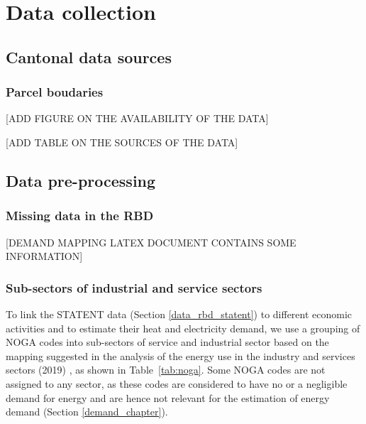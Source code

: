 \appendix
{} %

\chapter{Data collection}

\section{Cantonal data sources}

\subsection*{Parcel boudaries}
\label{app:canton_parcels}

 [ADD FIGURE ON THE AVAILABILITY OF THE DATA]
 
  [ADD TABLE ON THE SOURCES OF THE DATA]

\section{Data pre-processing}

\subsection*{Missing data in the RBD}
\label{app:rbd}
[DEMAND MAPPING LATEX DOCUMENT CONTAINS SOME INFORMATION]

\subsection*{Sub-sectors of industrial and service sectors}
\label{app:noga}

To link the STATENT data (Section \ref{data_rbd_statent}) to different economic activities and to estimate their heat and electricity demand, we use a grouping of NOGA codes into sub-sectors of service and industrial sector based on the mapping suggested in the analysis of the energy use in the industry and services sectors (2019) \cite{bfe_energieverbrauch_2019}, as shown in Table~\ref{tab:noga}. Some NOGA codes are not assigned to any sector, as these codes are considered to have no or a negligible demand for energy and are hence not relevant for the estimation of energy demand (Section \ref{demand_chapter}).


